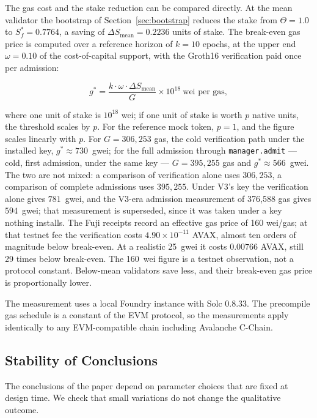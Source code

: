 \documentclass[11pt,a4paper]{article}
\numberwithin{equation}{section}
\numberwithin{table}{section}
\begin{document}
The gas cost and the stake reduction can be compared directly. At the mean validator the bootstrap of Section~\ref{sec:bootstrap} reduces the stake from $\Theta = 1.0$ to $S_f^* = 0.7764$, a saving of $\Delta S_{\mathrm{mean}} = 0.2236$ units of stake. The break-even gas price is computed over a reference horizon of $k = 10$ epochs, at the upper end $\omega = 0.10$ of the cost-of-capital support, with the Groth16 verification paid once per admission:

\begin{equation}
g^* = \frac{k \cdot \omega \cdot \Delta S_{\mathrm{mean}}}{G} \times 10^{18}\ \text{wei per gas},
\label{eq:gas-breakeven}
\end{equation}

where one unit of stake is $10^{18}$ wei; if one unit of stake is worth $p$ native units, the threshold scales by $p$. For the reference mock token, $p=1$, and the figure scales linearly with $p$. For $G = 306{,}253$ gas, the cold verification path under the installed key, $g^* \approx 730$~gwei; for the full admission through \texttt{manager.admit} --- cold, first admission, under the same key --- $G = 395{,}255$ gas and $g^* \approx 566$~gwei. The two are not mixed: a comparison of verification alone uses $306{,}253$, a comparison of complete admissions uses $395{,}255$. Under V3's key the verification alone gives $781$~gwei, and the V3-era admission measurement of 376,588 gas gives $594$~gwei; that measurement is superseded, since it was taken under a key nothing installs. The Fuji receipts record an effective gas price of 160 wei/gas; at that testnet fee the verification costs $4.90 \times 10^{-11}$ AVAX, almost ten orders of magnitude below break-even. At a realistic 25~gwei it costs $0.00766$ AVAX, still 29 times below break-even. The 160~wei figure is a testnet observation, not a protocol constant. Below-mean validators save less, and their break-even gas price is proportionally lower.

The measurement uses a local Foundry instance with Solc 0.8.33. The precompile gas schedule is a constant of the EVM protocol, so the measurements apply identically to any EVM-compatible chain including Avalanche C-Chain.

\subsection{Stability of Conclusions}
\label{subsec:stability}
The conclusions of the paper depend on parameter choices that are fixed at design time. We check that small variations do not change the qualitative outcome.
\end{document}
